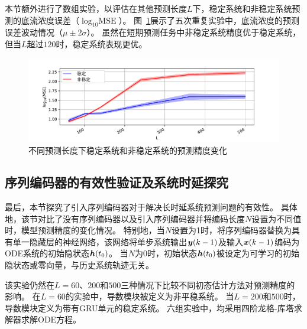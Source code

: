 本节额外进行了数组实验，以评估在其他预测长度$L$下，稳定系统和非稳定系统预测的底流浓度误差（$\log_{10}{\text{MSE}}$）。
图~\ref{fig:length_cmp}展示了五次重复实验中，底流浓度的预测误差波动情况（$\mu \pm 2\sigma$）。
虽然在短期预测任务中非稳定系统精度优于稳定系统，但当$L$超过$120$时，稳定系统表现更优。
\begin{figure}[h]
    \centering
    \includegraphics[width=\linewidth,trim=50 0 50 10, clip]{figures/chapter3/length_cmp.pdf}
    \caption{
    不同预测长度下稳定系统和非稳定系统的预测精度变化
    }
    \label{fig:length_cmp}
\end{figure}




\subsection{序列编码器的有效性验证及系统时延探究}
\label{sec:3_enc_length}
最后，本节探究了引入序列编码器对于解决长时延系统预测问题的有效性。
具体地，该节对比了没有序列编码器以及引入序列编码器并将编码长度$N$设置为不同值时，模型预测精度的变化情况。
特别地，当$N$设置为1时，将序列编码器替换为具有单一隐藏层的神经网络，该网络将单步系统输出$\boldsymbol y(k-1)$及输入$\boldsymbol x(k-1)$编码为ODE系统的初始隐状态$\boldsymbol h(t_0)$。
当$N$为0时，初始状态$\boldsymbol h(t_0)$被设定为可学习的初始隐状态\cite{Demeester2020SystemIW}或零向量，与历史系统轨迹无关。

该实验仍然在$L=60$、$200$和$500$三种情况下比较不同初态估计方法对预测精度的影响。
在$L=60$的实验中，导数模块被定义为非平稳系统。
当$L=200$和$500$时，导数模块定义为带有GRU单元的稳定系统。
六组实验中，均采用四阶龙格-库塔求解器求解ODE方程。



